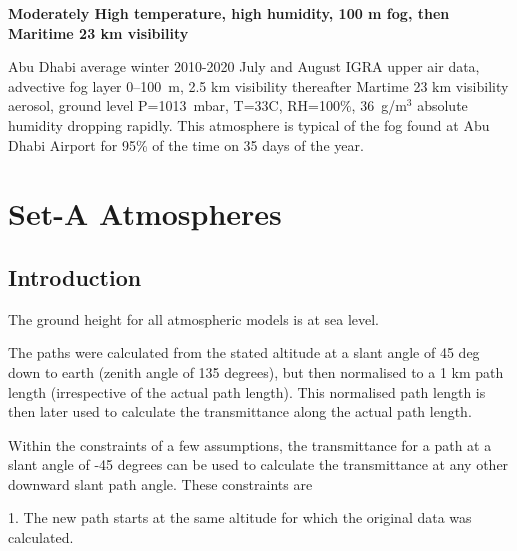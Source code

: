 \documentclass{workpackage}
\begin{document}
\textbf{Moderately High temperature, high humidity, 100 m fog, then Maritime 23 km visibility }

Abu Dhabi average winter 2010-2020 July and August IGRA upper air data, advective fog layer 0--100~m, 2.5 km visibility thereafter Martime 23 km visibility aerosol, ground level P=1013~mbar, T=33C, RH=100\%, 36~g/m$^3$ absolute humidity dropping rapidly. This atmosphere is typical of the fog found at Abu Dhabi Airport for 95\% of the time on 35 days of the year.




\chapter{Set-A Atmospheres}
\label{sec:Set-AAtmospheres}



\section{Introduction}
\label{sec:Introduction}

The ground height for all atmospheric models is at sea level.


The paths were calculated from the stated altitude at a slant angle of 45 deg down to earth (zenith angle of 135 degrees), but then normalised to a 1 km path length (irrespective of the actual path length).  This normalised path length is then later used to calculate the transmittance along the actual path length.


Within the constraints of a few assumptions, the transmittance for a path at a slant angle of -45 degrees can be used to calculate the transmittance at any other downward slant path angle.  These constraints are 


 1. The new path starts at the same altitude for which the original data was calculated.    
\end{document}
